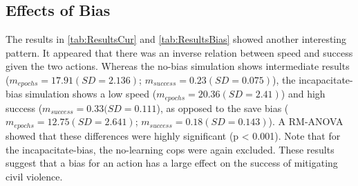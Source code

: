 \subsection{Effects of Bias}
The results in \autoref{tab:ResultsCur} and \autoref{tab:ResultsBias} showed another interesting pattern. It appeared that there was an inverse relation between speed and success given the two actions. Whereas the no-bias simulation shows intermediate results ($m_{epochs} = 17.91 (SD = 2.136)$; $m_{success} = 0.23 (SD = 0.075) $), the incapacitate-bias simulation shows a low speed ($m_{epochs} = 20.36 (SD = 2.41)$) and high success ($m_{success} = 0.33 (SD = 0.111$), as opposed to the save bias ($m_{epochs} = 12.75 (SD = 2.641)$; $m_{success} = 0.18 (SD = 0.143)$). A RM-ANOVA showed that these differences were highly significant (p < 0.001). Note that for the incapacitate-bias, the no-learning cops were again excluded. These results suggest that a bias for an action has a large effect on the success of mitigating civil violence. 
